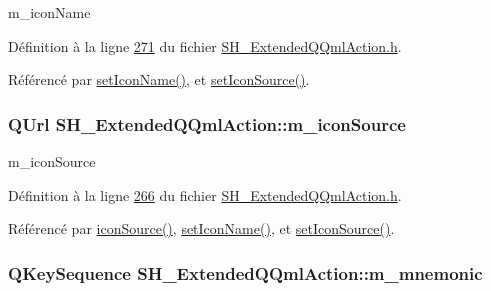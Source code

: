 m\-\_\-icon\-Name 



Définition à la ligne \hyperlink{SH__ExtendedQQmlAction_8h_source_l00271}{271} du fichier \hyperlink{SH__ExtendedQQmlAction_8h_source}{S\-H\-\_\-\-Extended\-Q\-Qml\-Action.\-h}.



Référencé par \hyperlink{classSH__ExtendedQQmlAction_a348526d65cd47b4ea6378e2a62065135}{set\-Icon\-Name()}, et \hyperlink{classSH__ExtendedQQmlAction_ae34fe314ba335d65d99932b27f1404f7}{set\-Icon\-Source()}.

\hypertarget{classSH__ExtendedQQmlAction_a61c8633eab1fa3b69752074220e785fc}{
\subsubsection[{m\-\_\-icon\-Source}]{\setlength{\rightskip}{0pt plus 5cm}Q\-Url S\-H\-\_\-\-Extended\-Q\-Qml\-Action\-::m\-\_\-icon\-Source\hspace{0.3cm}{\ttfamily [private]}}}\label{classSH__ExtendedQQmlAction_a61c8633eab1fa3b69752074220e785fc}


m\-\_\-icon\-Source 



Définition à la ligne \hyperlink{SH__ExtendedQQmlAction_8h_source_l00266}{266} du fichier \hyperlink{SH__ExtendedQQmlAction_8h_source}{S\-H\-\_\-\-Extended\-Q\-Qml\-Action.\-h}.



Référencé par \hyperlink{classSH__ExtendedQQmlAction_a4256635783087124d3df6fa9726e7d55}{icon\-Source()}, \hyperlink{classSH__ExtendedQQmlAction_a348526d65cd47b4ea6378e2a62065135}{set\-Icon\-Name()}, et \hyperlink{classSH__ExtendedQQmlAction_ae34fe314ba335d65d99932b27f1404f7}{set\-Icon\-Source()}.

\hypertarget{classSH__ExtendedQQmlAction_a7c924c07aa50a7228b6e8f31c4520896}{
\subsubsection[{m\-\_\-mnemonic}]{\setlength{\rightskip}{0pt plus 5cm}Q\-Key\-Sequence S\-H\-\_\-\-Extended\-Q\-Qml\-Action\-::m\-\_\-mnemonic\hspace{0.3cm}{\ttfamily [private]}}}\label{classSH__ExtendedQQmlAction_a7c924c07aa50a7228b6e8f31c4520896}


